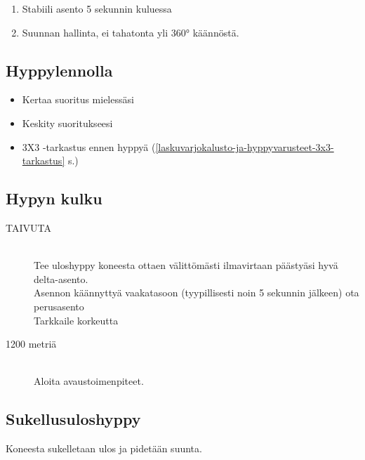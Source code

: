 \begin{multicols}{2}
\begin{enumerate}[label=\bfseries \arabic*)]
\item  Stabiili asento 5 sekunnin kuluessa 
\item  Suunnan hallinta, ei tahatonta yli 360° käännöstä. 
\end{enumerate}
\subsection{ Hyppylennolla }
\label{pl-peruskoulutuksen-suoritukset-hyppylennolla}

\begin{itemize}
\item Kertaa suoritus mielessäsi 
\item Keskity suoritukseesi 
\item 3X3 -tarkastus ennen hyppyä (\ref{laskuvarjokalusto-ja-hyppyvarusteet-3x3-tarkastus} s.\pageref{laskuvarjokalusto-ja-hyppyvarusteet-3x3-tarkastus}) 
\end{itemize}
\subsection{ Hypyn kulku }
\label{pl-peruskoulutuksen-suoritukset-hypyn-kulku}

\begin{description}
\item[TAIVUTA] \hfill \\ 
Tee uloshyppy koneesta ottaen välittömästi ilmavirtaan päästyäsi hyvä delta-asento. \hfill \\ 
Asennon käännyttyä vaakatasoon (tyypillisesti noin 5 sekunnin jälkeen) ota perusasento \hfill \\ 
Tarkkaile korkeutta \hfill \\ 
\item[1200 metriä] \hfill \\ 
Aloita avaustoimenpiteet. \hfill \\ 
\end{description}

\end{multicols}\pagebreak\begin{multicols}{2} 

\section{ Sukellusuloshyppy }
\label{pl-peruskoulutuksen-suoritukset-sukellusuloshyppy}


Koneesta sukelletaan ulos ja pidetään suunta. 


\end{multicols}

